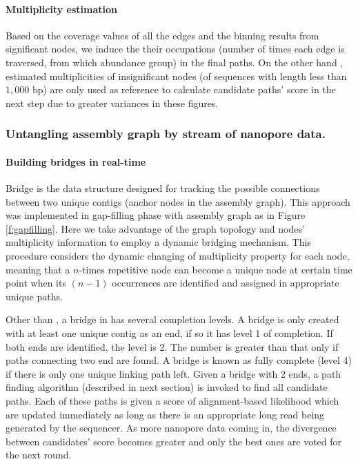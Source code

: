 \paragraph{Multiplicity estimation}
Based on the coverage values of all the edges and the binning results from significant nodes, we induce the their occupations (number of times each edge is traversed, from which abundance group) in the final paths.
On the other hand , estimated multiplicities of insignificant nodes (of sequences with length less than $1,000$ bp) are only used as reference to calculate candidate paths' score in the next step due to greater variances in these figures.

\subsubsection{Untangling assembly graph by stream of nanopore data.}
\paragraph{Building bridges in real-time}
Bridge is the data structure designed for tracking the possible connections between two unique contigs (anchor nodes in the assembly graph). This approach was implemented in \npscarf{} gap-filling phase with assembly graph as in Figure \ref{f:gapfilling}.
Here we take advantage of the graph topology and nodes' multiplicity information to employ a dynamic bridging mechanism.
This procedure considers the dynamic changing of multiplicity property for each node, meaning that a $n$-times repetitive node can become a unique node at certain time point when its $(n-1)$ occurrences are identified and assigned in appropriate unique paths. 

Other than \npscarf{}, a bridge in \npgraph{} has several completion levels. A bridge is only created with at least one unique contig as an end, if so it has level 1 of completion. If both ends are identified, the level is 2. The number is greater than that only if paths connecting two end are found. A bridge is known as fully complete (level 4) if there is only one unique linking path left. Given a bridge with 2 ends, a path finding algorithm (described in next section) is invoked to find all candidate paths. Each of these paths is given a score of alignment-based likelihood which are updated immediately as long as there is an appropriate long read being generated by the sequencer. As more nanopore data coming in, the divergence between candidates' score becomes greater and only the best ones are voted for the next round.

